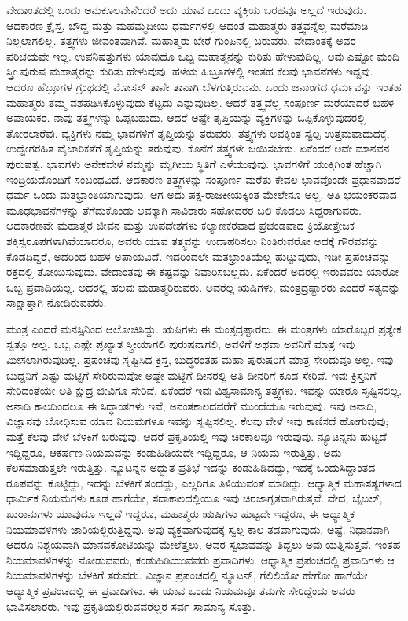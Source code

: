 ವೇದಾಂತದಲ್ಲಿ ಒಂದು ಅನುಕೂಲವೇನೆಂದರೆ ಅದು ಯಾವ ಒಂದು ವ್ಯಕ್ತಿಯ ಬರಹವೂ ಅಲ್ಲದೆ ಇರುವುದು. ಆದಕಾರಣ ಕ್ರೈಸ್ತ, ಬೌದ್ಧ ಮತ್ತು ಮಹಮ್ಮದೀಯ ಧರ್ಮಗಳಲ್ಲಿ ಆದಂತೆ ಮಹಾತ್ಮರು ತತ್ತ್ವವನ್ನೆಲ್ಲ ಮರೆಮಾಡಿ ನಿಲ್ಲಲಾಗಲಿಲ್ಲ. ತತ್ತ್ವಗಳು ಜೀವಂತವಾಗಿವೆ. ಮಹಾತ್ಮರು ಬೇರೆ ಗುಂಪಿನಲ್ಲಿ ಬರುವರು. ವೇದಾಂತಕ್ಕೆ ಅವರ ಪರಿಚಯವೇ ಇಲ್ಲ. ಉಪನಿಷತ್ತುಗಳು ಯಾವುದೊ ಒಬ್ಬ ಮಹಾತ್ಮನನ್ನು ಕುರಿತು ಹೇಳುವುದಿಲ್ಲ. ಅವು ಎಷ್ಟೋ ಮಂದಿ ಸ್ತ್ರೀ ಪುರುಷ ಮಹಾತ್ಮರನ್ನು ಕುರಿತು ಹೇಳುವುವು. ಹಳೆಯ ಹಿಬ್ರೂಗಳಲ್ಲಿ ಇಂತಹ ಕೆಲವು ಭಾವನೆಗಳು ಇದ್ದವು. ಆದರೂ ಹೆಬ್ರೂಗಳ ಗ್ರಂಥದಲ್ಲಿ ಮೋಸಸ್ ತಾನೇ ತಾನಾಗಿ ಬೆಳಗುತ್ತಿರುವನು. ಒಂದು ಜನಾಂಗದ ಧರ್ಮವನ್ನು ಇಂತಹ ಮಹಾತ್ಮರು ತಮ್ಮ ವಶಪಡಿಸಿಕೊಳ್ಳುವುದು ಕೆಟ್ಟದು ಎನ್ನುವುದಿಲ್ಲ. ಆದರೆ ತತ್ತ್ವವೆಲ್ಲ ಸಂಪೂರ್ಣ ಮರೆಯಾದರೆ ಬಹಳ ಅಪಾಯಕರ. ನಾವು ತತ್ತ್ವಗಳನ್ನು ಒಪ್ಪಬಹುದು. ಆದರೆ ಅಷ್ಟೇ ತೃಪ್ತಿಯನ್ನು ವ್ಯಕ್ತಿಗಳನ್ನು ಒಪ್ಪಿಕೊಳ್ಳುವುದರಲ್ಲಿ ತೋರಲಾರೆವು. ವ್ಯಕ್ತಿಗಳು ನಮ್ಮ ಭಾವಗಳಿಗೆ ತೃಪ್ತಿಯನ್ನು ತರುವರು. ತತ್ತ್ವಗಳು ಅವಕ್ಕಿಂತ ಸ್ವಲ್ಪ ಉತ್ತಮವಾದುದಕ್ಕೆ, ಉದ್ವೇಗರಹಿತ ವೈಚಾರಿಕತೆಗೆ ತೃಪ್ತಿಯನ್ನು ತರುವುವು. ಕೊನೆಗೆ ತತ್ತ್ವಗಳೇ ಜಯಿಸಬೇಕು. ಏಕೆಂದರೆ ಅವೇ ಮಾನವನ ಪುರುಷತ್ವ. ಭಾವಗಳು ಅನೇಕವೇಳೆ ನಮ್ಮನ್ನು ಮೃಗೀಯ ಸ್ಥಿತಿಗೆ ಎಳೆಯುವುವು. ಭಾವಗಳಿಗೆ ಯುಕ್ತಿಗಿಂತ ಹೆಚ್ಚಾಗಿ ಇಂದ್ರಿಯದೊಂದಿಗೆ ಸಂಬಂಧವಿದೆ. ಆದಕಾರಣ ತತ್ತ್ವಗಳನ್ನು ಸಂಪೂರ್ಣ ಮರೆತು ಕೇವಲ ಭಾವವೊಂದೇ ಪ್ರಧಾನವಾದರೆ ಧರ್ಮ ಒಂದು ಮತಭ್ರಾಂತಿಯಾಗುವುದು. ಆಗ ಅದು ಪಕ್ಷ-ರಾಜಕೀಯಕ್ಕಿಂತ ಮೇಲೇನೂ ಅಲ್ಲ. ಅತಿ ಭಯಂಕರವಾದ ಮೂಢಭಾವನೆಗಳನ್ನು ತೆಗೆದುಕೊಂಡು ಅವಕ್ಕಾಗಿ ಸಾವಿರಾರು ಸಹೋದರರ ಬಲಿ ಕೊಡಲು ಸಿದ್ದರಾಗುವರು. ಆದಕಾರಣವೇ ಮಹಾತ್ಮರ ಜೀವನ ಮತ್ತು ಉಪದೇಶಗಳು ಕಲ್ಯಾಣಕರವಾದ ಪ್ರಚಂಡವಾದ ಕ್ರಿಯೋತ್ತೇಜಕ ಶಕ್ತಿಸ್ವರೂಪಗಳಾಗಿವೆಯಾದರೂ, ಅವರು ಯಾವ ತತ್ತ್ವವನ್ನು ಉದಾಹರಿಸಲು ನಿಂತಿರುವರೋ ಅದಕ್ಕೆ ಗೌರವವನ್ನು ಕೊಡದಿದ್ದರೆ, ಅದರಿಂದ ಬಹಳ ಅಪಾಯವಿದೆ. ಇದರಿಂದಲೇ ಮತಭ್ರಾಂತಿಯೆಲ್ಲ ಹುಟ್ಟುವುದು, ಇಡೀ ಪ್ರಪಂಚವನ್ನು ರಕ್ತದಲ್ಲಿ ತೋಯಿಸುವುದು. ವೇದಾಂತವು ಈ ಕಷ್ಟವನ್ನು ನಿವಾರಿಸಬಲ್ಲದು. ಏಕೆಂದರೆ ಅದರಲ್ಲಿ ಇರುವವರು ಯಾರೋ ಒಬ್ಬ ಪ್ರವಾದಿಯಲ್ಲ. ಅದರಲ್ಲಿ ಹಲವು ಮಹಾತ್ಮರಿರುವರು. ಅವರೆಲ್ಲ ಋಷಿಗಳು, ಮಂತ್ರದ್ರಷ್ಟಾರರು ಎಂದರೆ ಸತ್ಯವನ್ನು ಸಾಕ್ಷಾತ್ತಾಗಿ ನೋಡಿರುವವರು.

ಮಂತ್ರ ಎಂದರೆ ಮನಸ್ಸಿನಿಂದ ಆಲೋಚಿಸಿದ್ದು. ಋಷಿಗಳು ಈ ಮಂತ್ರದ್ರಷ್ಟಾರರು. ಈ ಮಂತ್ರಗಳು ಯಾರೊಬ್ಬರ ಪ್ರತ್ಯೇಕ ಸ್ವತ್ತೂ ಅಲ್ಲ. ಒಬ್ಬ ಎಷ್ಟೇ ಪ್ರಖ್ಯಾತ ಸ್ತ್ರೀಯಾಗಲಿ ಪುರುಷನಾಗಲಿ, ಅವಳಿಗೆ ಅಥವಾ ಅವನಿಗೆ ಮಾತ್ರ ಇವು ಮೀಸಲಾಗಿರುವುದಿಲ್ಲ. ಪ್ರಪಂಚವು ಸೃಷ್ಟಿಸಿದ ಕ್ರಿಸ್ತ, ಬುದ್ಧರಂತಹ ಮಹಾ ಪುರುಷರಿಗೆ ಮಾತ್ರ ಸೇರಿದುವೂ ಅಲ್ಲ. ಇವು ಬುದ್ದನಿಗೆ ಎಷ್ಟು ಮಟ್ಟಿಗೆ ಸೇರಿರುವುವೋ ಅಷ್ಟೇ ಮಟ್ಟಿಗೆ ದೀನರಲ್ಲಿ ಅತಿ ದೀನರಿಗೆ ಕೂಡ ಸೇರಿವೆ. ಇವು ಕ್ರಿಸ್ತನಿಗೆ ಸೇರಿದಂತೆಯೇ ಅತಿ ಕ್ಷುದ್ರ ಜೀವಿಗೂ ಸೇರಿವೆ. ಏಕೆಂದರೆ ಇವು ವಿಶ್ವಸಾಮಾನ್ಯ ತತ್ತ್ವಗಳು. ಇವನ್ನು ಯಾರೂ ಸೃಷ್ಟಿಸಲಿಲ್ಲ. ಅನಾದಿ ಕಾಲದಿಂದಲೂ ಈ ಸಿದ್ಧಾಂತಗಳು ಇವೆ; ಅನಂತಕಾಲದವರೆಗೆ ಮುಂದೆಯೂ ಇರುವುವು. ಇವು ಅನಾದಿ, ವಿಜ್ಞಾನವು ಬೋಧಿಸುವ ಯಾವ ನಿಯಮಗಳೂ ಇವನ್ನು ಸೃಷ್ಟಿಸಲಿಲ್ಲ. ಕೆಲವು ವೇಳೆ ಇವು ಕಾಣಿಸದೆ ಹೋಗುವುವು; ಮತ್ತೆ ಕೆಲವು ವೇಳೆ ಬೆಳಕಿಗೆ ಬರುವುವು. ಆದರೆ ಪ್ರಕೃತಿಯಲ್ಲಿ ಇವು ಚಿರಕಾಲವೂ ಇರುವುವು. ನ್ಯೂಟನ್ನನು ಹುಟ್ಟದೆ ಇದ್ದಿದ್ದರೂ, ಆಕರ್ಷಣ ನಿಯಮವನ್ನು ಕಂಡುಹಿಡಿಯದೇ ಇದ್ದಿದ್ದರೂ, ಆ ನಿಯಮ ಇರುತ್ತಿತ್ತು, ಅದು ಕೆಲಸಮಾಡುತ್ತಲೇ ಇರುತ್ತಿತ್ತು. ನ್ಯೂಟನ್ನನ ಅದ್ಭುತ ಪ್ರತಿಭೆ ಇದನ್ನು ಕಂಡುಹಿಡಿದದ್ದು, ಇದಕ್ಕೆ ಒಂದುಸಿದ್ದಾಂತದ ರೂಪವನ್ನು ಕೊಟ್ಟಿದ್ದು, ಇದನ್ನು ಬೆಳಕಿಗೆ ತಂದದ್ದು, ಎಲ್ಲರಿಗೂ ತಿಳಿಯುವಂತೆ ಮಾಡಿದ್ದು. ಆಧ್ಯಾತ್ಮಿಕ ಮಹಾಸತ್ಯಗಳಾದ ಧಾರ್ಮಿಕ ನಿಯಮಗಳು ಕೂಡ ಹಾಗೆಯೇ, ಸದಾಕಾಲದಲ್ಲಿಯೂ ಇವು ಚಿರಜಾಗೃತವಾಗಿರುತ್ತವೆ. ವೇದ, ಬೈಬಲ್, ಖುರಾನುಗಳು ಯಾವುದೂ ಇಲ್ಲದೆ ಇದ್ದರೂ, ಮಹಾತ್ಮರು ಋಷಿಗಳು ಹುಟ್ಟದೇ ಇದ್ದರೂ, ಈ ಆಧ್ಯಾತ್ಮಿಕ ನಿಯಮಾವಳಿಗಳು ಜಾರಿಯಲ್ಲಿರುತ್ತಿದ್ದವು. ಅವು ವ್ಯಕ್ತವಾಗುವುದಕ್ಕೆ ಸ್ವಲ್ಪ ಕಾಲ ತಡವಾಗುವುದು, ಅಷ್ಟೆ. ನಿಧಾನವಾಗಿ ಆದರೂ ನಿಶ್ಚಯವಾಗಿ ಮಾನವಕೋಟಿಯನ್ನು ಮೇಲೆತ್ತಲು, ಅವರ ಸ್ವಭಾವವನ್ನು ತಿದ್ದಲು ಅವು ಯತ್ನಿಸುತ್ತವೆ. ಇಂತಹ ನಿಯಮಾವಳಿಗಳನ್ನು ನೋಡುವವರು, ಕಂಡುಹಿಡಿಯುವವರು ಪ್ರವಾದಿಗಳು. ಆಧ್ಯಾತ್ಮಿಕ ಪ್ರಪಂಚದಲ್ಲಿ ಪ್ರವಾದಿಗಳು ಆ ನಿಯಮಾವಳಿಗಳನ್ನು ಬೆಳಕಿಗೆ ತರುವರು. ವಿಜ್ಞಾನ ಪ್ರಪಂಚದಲ್ಲಿ ನ್ಯೂಟನ್, ಗೆಲಿಲಿಯೋ ಹೇಗೋ ಹಾಗೆಯೇ ಆಧ್ಯಾತ್ಮಿಕ ಪ್ರಪಂಚದಲ್ಲಿ ಈ ಪ್ರವಾದಿಗಳು. ಈ ಯಾವ ಒಂದು ನಿಯಮವೂ ತಮಗೇ ಸೇರಿದ್ದೆಂದು ಅವರು ಭಾವಿಸಲಾರರು. ಇವು ಪ್ರಕೃತಿಯಲ್ಲಿರುವವರೆಲ್ಲರ ಸರ್ವ ಸಾಮಾನ್ಯ ಸೊತ್ತು.

